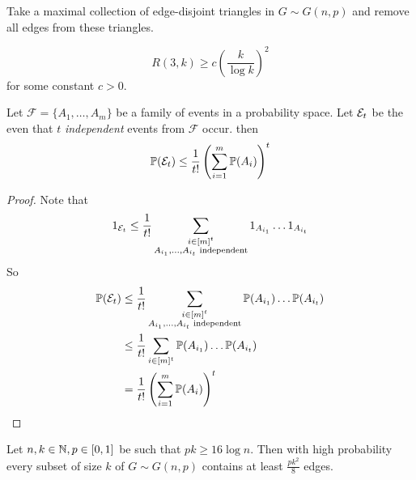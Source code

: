 \documentclass{article}
\begin{document}
\begin{idea}
  Take a maximal collection of edge-disjoint triangles in $G \sim G(n, p)$ and remove all edges from these triangles.
\end{idea}

\begin{thm}[Erd\H os]
  $$R(3, k) \ge c\left(\frac k{\log k}\right)^2$$
  for some constant $c > 0$.
\end{thm}

\begin{lemma}
  Let $\mathcal F = \{A_1, \dots, A_m\}$ be a family of events in a probability space. Let $\mathcal E_t$ be the even that $t$ {\it independent} events from $\mathcal F$ occur. then
  $$\mathbb P(\mathcal E_t) \le \frac 1{t!}\left(\sum_{i = 1}^m \mathbb P(A_i)\right)^t$$
\end{lemma}
\begin{proof}
  Note that
  $$1_{\mathcal E_t} \le \frac 1{t!} \sum_{\substack{i \in [m]^t \\ A_{i_1}, \dots, A_{i_t}\text{ independent}}} 1_{A_{i_1}} \dots 1_{A_{i_t}}$$
  So
  \begin{align*}
    \mathbb P(\mathcal E_t)
    & \le \frac 1{t!} \sum_{\substack{i \in [m]^t \\ A_{i_1}, \dots, A_{i_t}\text{ independent}}} \mathbb P(A_{i_1}) \dots \mathbb P(A_{i_t}) \\
    & \le \frac 1{t!} \sum_{i \in [m]^t} \mathbb P(A_{i_1}) \dots \mathbb P(A_{i_t}) \\
    & = \frac 1{t!} \left(\sum_{i = 1}^m \mathbb P(A_i)\right)^t
  \end{align*}
\end{proof}

\newlec

\begin{lemma}
  Let $n, k \in \mathbb N, p \in [0, 1]$ be such that $pk \ge 16\log n$. Then with high probability every subset of size $k$ of $G \sim G(n, p)$ contains at least $\frac{pk^2}8$ edges.
\end{lemma}
\end{document}
